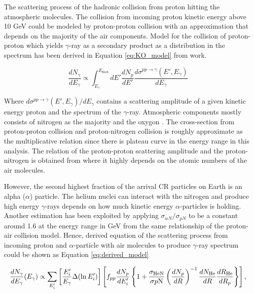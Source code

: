 The scattering process of the hadronic collision from proton hitting 
the atmospheric molecules. The collision from incoming proton kinetic 
energy above 10 GeV could be modeled by proton-proton collision with 
an approximation that depends on the majority of the air components.
Model for the collision of proton-proton which yields $\gamma$-ray 
as a secondary product as a distribution in the spectrum has been 
derived in Equation \ref{eq:KO_model} from \cite{K&Omodel} work.

\begin{equation}
    \frac{dN_\gamma}{dE_\gamma} \propto \int^{E_{\text{max}}}_{E_\gamma} dE'\frac{dN_p}{dE'} \frac{d\sigma^{pp\rightarrow\gamma}(E',E_\gamma)}{dE_\gamma}
    \label{eq:KO_model}
\end{equation}

Where $d\sigma^{pp\rightarrow\gamma}(E',E_\gamma)/dE_\gamma$ contains 
a scattering amplitude of a given kinetic energy proton and the 
spectrum of the $\gamma$-ray. Atmospheric components mostly consists 
of nitrogen as the majority and the oxygon \citep{atmosCompos}. The cross-section from 
proton-proton collision and proton-nitrogen collision is roughly 
approximate as the multiplicative relation since there is plateau 
curve in the energy range in this analysis. The relation of the proton-proton 
scattering amplitude and the proton-nitrogen is obtained from \cite{WAtwater}
where it highly depends on the atomic numbers of the air molecules. 

However, the second highest fraction of the arrival CR particles on 
Earth is an alpha ($\alpha$) particle. The helium nuclei can interact with the nitrogen and produce high energy $\gamma$-rays depends on
how much kinetic energy $\alpha$-particles is holding. Another 
estimation has been exploited by applying $\sigma_{\alpha N}/\sigma_{pN}$
to be a constant around 1.6 at the energy range in GeV from 
the same relationship of the proton-air collision model. Hence, derived
equation of the scattering process from incoming 
proton and $\alpha$-particle with air molecules to produce $\gamma$-ray
spectrum could be shown as Equation \ref{eq:derived_model}

\begin{equation}
    \frac{dN_{\gamma}}{dE_\gamma}(E_\gamma) \propto
    \sum_{E'_i}\left[\frac{E'_i}{E_{\gamma}}\Delta(\ln E'_i) \right]
    \left[ 
        f_{pp}\frac{dN_p}{dE'_i}
        \left\{
            1+\frac{\sigma_{\text{HeN}}}{\sigma{p\rm N}}\left(\frac{dN_p}{dR}\right)^{-1} \frac{dN_{\text{He}}}{dR} \frac{dR_{\text{He}}}{dR_p} 
        \right\}
    \right]
    ,\label{eq:derived_model}
\end{equation}

